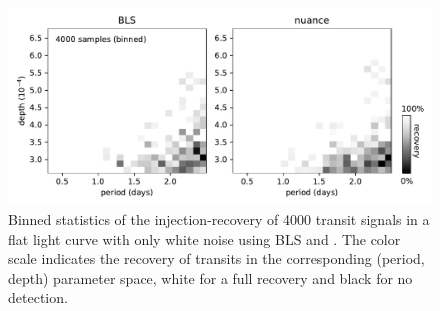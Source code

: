\documentclass[modern]{aastex631}
\begin{document}
\begin{figure}[H]
    \begin{centering}
        \includegraphics[width=\linewidth]{./control_test.pdf}
        \caption{Binned statistics of the injection-recovery of 4000 transit signals in a flat light curve with only white noise using \textsf{BLS} and \nuancecode{}. The color scale indicates the recovery of transits in the corresponding (period, depth) parameter space, white for a full recovery and black for no detection. }
        \label{fig:control}
    \end{centering}
\end{figure}



\newpage
\end{document}
